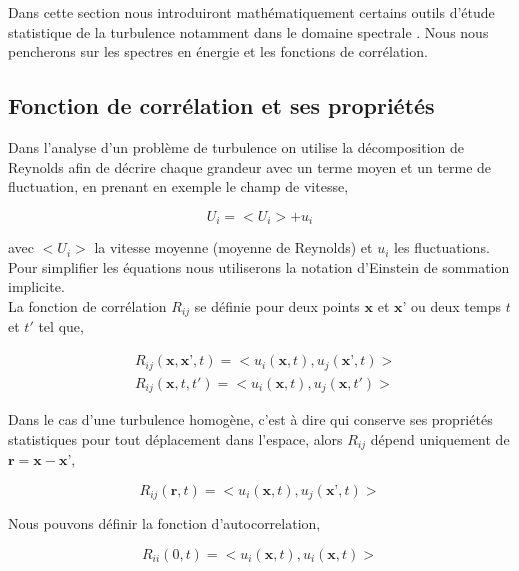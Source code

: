 \documentclass[12pt]{article}
\theoremstyle{plain}
\theoremstyle{remark}
\begin{document}
	Dans cette section nous introduiront mathématiquement certains outils d'étude statistique de la turbulence notamment dans le domaine spectrale . Nous nous pencherons sur les spectres en énergie et les fonctions de corrélation.
	
	\subsection{Fonction de corrélation et ses propriétés}
		
		Dans l'analyse d'un problème de turbulence on utilise la décomposition de Reynolds afin de décrire chaque grandeur avec un terme moyen et un terme de fluctuation, en prenant en exemple le champ de vitesse, 
		
		\begin{equation}
			U_i=<U_i> + u_i 	
		\end{equation}
	
		avec $<U_i>$ la vitesse moyenne (moyenne de Reynolds) et $u_i$ les fluctuations. \\
		Pour simplifier les équations nous utiliserons la notation d'Einstein de sommation implicite. \\
		La fonction de corrélation $R_{ij}$ se définie pour deux points $\textbf{x}$ et $\textbf{x'}$ ou deux temps $t$ et $t'$  tel que,
		
		\begin{equation}
		\begin{split}
			&R_{ij}(\textbf{x},\textbf{x'},t) = <u_i(\textbf{x},t), u_j(\textbf{x'},t)> \\
			&R_{ij}(\textbf{x},t,t') = <u_i(\textbf{x},t), u_j(\textbf{x},t')>
		\end{split}
		\end{equation}
	
		Dans le cas d'une turbulence homogène, c'est à dire qui conserve ses propriétés statistiques pour tout déplacement dans l'espace, alors $R_{ij}$ dépend uniquement de $\textbf{r}=\textbf{x}-\textbf{x'}$,
		
		\begin{equation}
			R_{ij}(\textbf{r},t) = <u_i(\textbf{x},t), u_j(\textbf{x'},t)>
		\end{equation}
	
		Nous pouvons définir la fonction d'autocorrelation,
		
		\begin{equation}
			R_{ii}(0,t) = <u_i(\textbf{x},t), u_i(\textbf{x},t)>
		\end{equation}
	
\end{document}
